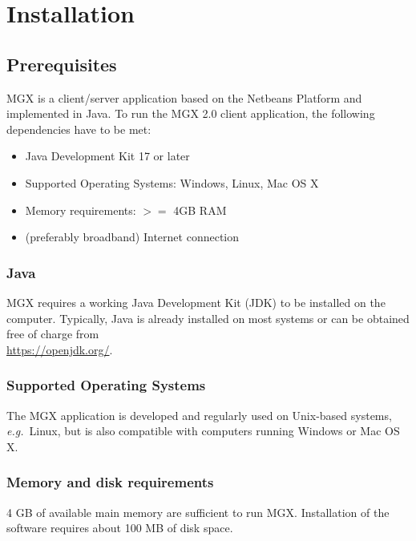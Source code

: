 
\chapter{Installation}
\label{installation}

\section{Prerequisites}

MGX is a client/server application based on the Netbeans Platform and implemented
in Java. To run the MGX 2.0 client application, the following dependencies have to be
met:

\begin{itemize}
  \item{Java Development Kit 17 or later}
  \item{Supported Operating Systems: Windows, Linux, Mac OS X}
  \item{Memory requirements: $>=$ 4GB RAM}
  \item{(preferably broadband) Internet connection}
\end{itemize}

\subsection{Java}

MGX requires a working Java Development Kit (JDK) to be installed on the computer. Typically,
Java is already installed on most systems or can be obtained free of charge from\\

\url{https://openjdk.org/}.\\

\subsection{Supported Operating Systems}

The MGX application is developed and regularly used on Unix-based systems, \textit{e.g.}~Linux,
but is also compatible with computers running Windows or Mac OS X.

\subsection{Memory and disk requirements}

4 GB of available main memory are sufficient to run MGX. Installation of the
software requires about 100 MB of disk space.

